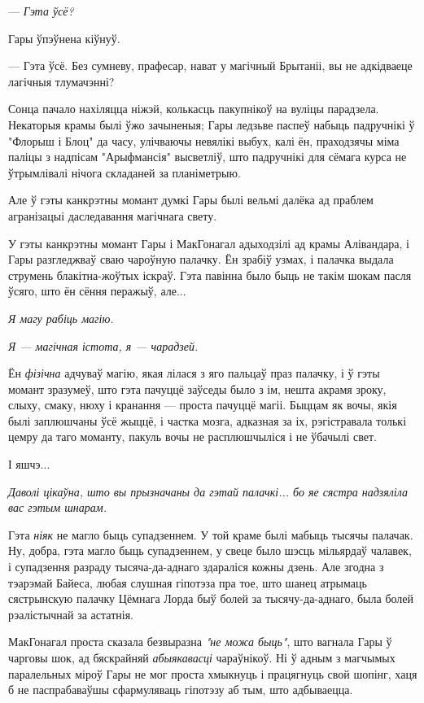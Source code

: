 --- \emph{Гэта ўсё?}

Гары ўпэўнена кіўнуў. 

--- Гэта ўсё. Без сумневу, прафесар, нават у магічный Брытаніі, вы не адкідваеце
лагічныя тлумачэнні?


\later

Сонца пачало нахіляцца ніжэй, колькасць пакупнікоў на вуліцы парадзела.
Некаторыя крамы былі 
ўжо зачыненыя; Гары ледзьве паспеў набыць падручнікі ў "Флорыш і Блоц" да часу,
улічваючы невялікі выбух, калі ён, праходзячы міма паліцы з надпісам
"Арыфмансія" высветліў, што падручнікі для сёмага курса не ўтрымлівалі нічога 
складаней за планіметрыю.

Але ў гэты канкрэтны момант думкі Гары былі вельмі далёка ад праблем агранізацыі
даследавання магічнага свету.

У гэты канкрэтны момант Гары і МакГонагал адыходзілі ад крамы Алівандара, і 
Гары разгледжваў сваю чароўную палачку. Ён зрабіў узмах, і палачка выдала 
струмень блакітна-жоўтых іскраў. Гэта павінна было быць не такім шокам пасля
ўсяго, што ён сёння перажыў, але... 

\emph{Я магу рабіць магію.}

\emph{Я --- магічная істота, я --- чарадзей.}

Ён \emph{фізічна} адчуваў магію, якая лілася з яго пальцаў праз палачку, і ў 
гэты момант зразумеў, што гэта пачуццё заўседы было з ім, нешта акрамя зроку,
слыху, смаку, нюху і кранання --- проста пачуццё магіі.
Быццам як вочы, якія былі заплюшчаны ўсё жыццё, і частка мозга, адказная за 
іх, рэгістравала толькі цемру да таго моманту, пакуль вочы не расплюшчыліся
і не ўбачылі свет.

І яшчэ...

\emph{Даволі цікаўна, што вы прызначаны да гэтай палачкі... бо яе сястра надзяліла 
вас гэтым шнарам.}

Гэта \emph{ніяк} не магло быць супадзеннем. У той краме былі мабыць тысячы палачак.
Ну, добра, гэта магло быць супадзеннем, у свеце было шэсць мільярдаў чалавек, 
і супадзення разраду тысяча-да-аднаго здараліся кожны дзень. 
Але згодна з тэарэмай Байеса, любая слушная гіпотэза пра тое, што шанец атрымаць сястрынскую
палачку Цёмнага Лорда быў болей за тысячу-да-аднаго, была болей рэалістычнай за астатнія. 

МакГонагал проста сказала безвыразна \emph{"не можа быць"}, што вагнала Гары ў 
чарговы шок, ад бяскрайняй \emph{абыякавасці} чараўнікоў. Ні ў адным з 
магчымых паралельных міроў Гары не мог проста хмыкнуць і працягнуць 
свой шопінг, хаця б не паспрабаваўшы сфармуляваць гіпотэзу аб тым, што
адбываецца.

